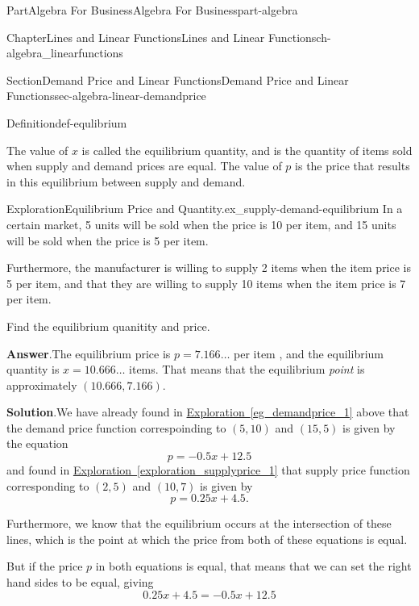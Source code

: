 \documentclass{tufte-book}
\newcommand{\blocktitlefont}{\relax}
\newcommand{\xreffont}{\relax}
\numberwithin{equation}{chapter}
\begin{document}
\begin{partptx}{Part}{Algebra For Business}{}{Algebra For Business}{}{}{part-algebra}
\begin{chapterptx}{Chapter}{Lines and Linear Functions}{}{Lines and Linear Functions}{}{}{ch-algebra_linearfunctions}
\begin{sectionptx}{Section}{Demand Price and Linear Functions}{}{Demand Price and Linear Functions}{}{}{sec-algebra-linear-demandprice}
\begin{definition}{Definition}{}{def-equlibrium}
\par
The value of \(x\) is called the equilibrium quantity, and is the quantity of items sold when supply and demand prices are equal. The value of \(p\) is the price that results in this equilibrium between supply and demand.%
\end{definition}
\begin{exploration}{Exploration}{Equilibrium Price and Quantity.}{ex_supply-demand-equilibrium}%
In a certain market, 5 units will be sold when the price is 10 \textdollar{} per item, and 15 units will be sold when the price is 5 \textdollar{} per item.%
\par
Furthermore, the manufacturer is willing to supply 2 items when the item price is 5 \textdollar{} per item, and that they are willing to supply 10 items when the item price is 7 \textdollar{} per item.%
\par
Find the equilibrium quanitity and price.%
\par\smallskip%
\noindent\textbf{\blocktitlefont Answer}.\hypertarget{ex_supply-demand-equilibrium-3}{}\quad{}The equilibrium price is \(p=7.166\dots\) \textdollar{} per item , and the equilibrium quantity is \(x=10.666\dots\) items.  That means that the equilibrium \emph{point} is approximately \((10.666,7.166)\).%
\par\smallskip%
\noindent\textbf{\blocktitlefont Solution}.\hypertarget{ex_supply-demand-equilibrium-4}{}\quad{}We have already found in \hyperref[eg_demandprice_1]{Exploration~{\xreffont\ref{eg_demandprice_1}}} above that the demand price function correspoinding to \((5,10)\) and \((15,5)\) is given by the equation%
\begin{equation*}
p=-0.5x + 12.5
\end{equation*}
and found in \hyperref[exploration_supplyprice_1]{Exploration~{\xreffont\ref{exploration_supplyprice_1}}} that supply price function corresponding to \((2,5)\) and \((10,7)\) is given by%
\begin{equation*}
p =  0.25x + 4.5\text{.}
\end{equation*}
%
\par
Furthermore, we know that the equilibrium occurs at the intersection of these lines, which is the point at which the price from both of these equations is equal.%
\par
But if the price \(p\) in both equations is equal, that means that we can set the right hand sides to be equal, giving%
\begin{equation*}
0.25x + 4.5 = -0.5x + 12.5
\end{equation*}

\end{exploration}
\end{sectionptx}
\end{chapterptx}
\end{partptx}
\end{document}
